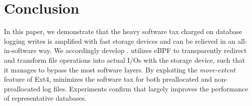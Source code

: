 \section{Conclusion}\label{sec:conclusion}


In this paper, 
we demonstrate  that the heavy software tax charged on database logging  writes
is amplified with fast storage devices and
 can be relieved 
in an all-in-software way. We accordingly develop \odes.
\odes %
utilizes eBPF to transparently redirect and transform  file operations into actual I/Os with the storage device,
such that  it manages to bypass the most software layers.
By exploiting the {\em move-extent} feature of Ext4,
\odes minimizes the software tax for  %
both
preallocated and non-preallocated log files.
 Experiments confirm that \odes largely improves the  performance of representative databases. %
